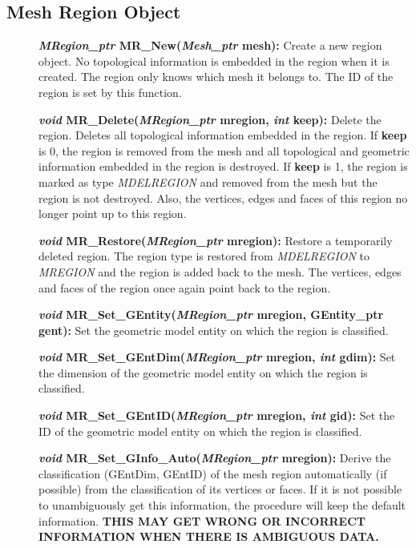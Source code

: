 \documentclass[12pt]{article}
\begin{document}
\newpage
\subsection{Mesh Region Object}

\begin{description}
\item[]{\bf {\em MRegion\_ptr} MR\_New({\em Mesh\_ptr}
    mesh):} Create a new region object. No topological information is
  embedded in the region when it is created. The region only knows
  which mesh it belongs to. The ID of the region is set by this
  function.

\item[]{\bf {\em void} MR\_Delete({\em MRegion\_ptr} mregion,
    {\em int} keep):} Delete the region. Deletes all topological
  information embedded in the region. If {\bf keep} is 0, the
  region is removed from the mesh and all topological and geometric
  information embedded in the region is destroyed. If {\bf keep} is
  1, the region is marked as type {\em MDELREGION} and removed from
  the mesh but the region is not destroyed. Also, the vertices, edges
  and faces of this region no longer point up to this region.
    
\item[]{\bf {\em void} MR\_Restore({\em MRegion\_ptr}
    mregion):} Restore a temporarily deleted region. The region type
  is restored from {\em MDELREGION} to {\em MREGION} and the
  region is added back to the mesh. The vertices, edges and faces of
  the region once again point back to the region.

\item[]
  
\item[]{\bf {\em void} MR\_Set\_GEntity({\em MRegion\_ptr}
    mregion, GEntity\_ptr gent):} Set the geometric model entity on
  which the region is classified.
  
\item[]{\bf {\em void} MR\_Set\_GEntDim({\em MRegion\_ptr}
    mregion, {\em int} gdim):} Set the dimension of the geometric
  model entity on which the region is classified.
  
\item[]{\bf {\em void} MR\_Set\_GEntID({\em MRegion\_ptr}
    mregion, {\em int} gid):} Set the ID of the geometric model
  entity on which the region is classified.
  
\item[]{\bf {\em void} MR\_Set\_GInfo\_Auto({\em MRegion\_ptr} mregion):}
  Derive the classification (GEntDim, GEntID) of the mesh region
  automatically (if possible) from the classification of its
  vertices or faces. If it is not possible to unambiguously get this
  information, the procedure will keep the default information. {\bf THIS
  MAY GET WRONG OR INCORRECT INFORMATION WHEN THERE IS AMBIGUOUS
  DATA.}



\end{description}
\end{document}
